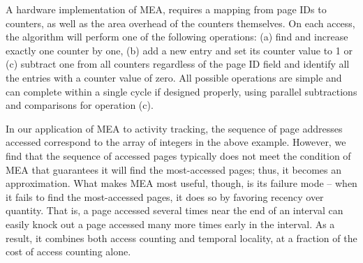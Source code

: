 A hardware implementation of MEA, requires a mapping from page IDs to counters, as well as the area overhead of the counters themselves. On each access, the algorithm will perform one of the following operations: (a) find and increase exactly one counter by one, (b) add a new entry and set its counter value to 1 or (c) subtract one from all counters regardless of the page ID field and identify all the entries with a counter value of zero. All possible operations are simple and can complete within a single cycle if designed properly, using parallel subtractions and comparisons for operation (c).



In our application of MEA to activity tracking, the sequence of page addresses accessed correspond to the array of integers in the above example. 
However, we find that the sequence of accessed pages typically does not
meet the condition of MEA that guarantees it will find the most-accessed
pages; thus, it becomes an approximation.  What makes MEA most useful,
though, is its failure mode -- when it fails to find the most-accessed pages,
it does so by favoring recency over quantity.  That is, a page accessed several
times near the end of an interval can easily knock out a page accessed many
more times early in the interval.  As a result, it combines both access
counting and temporal locality, at a fraction of the cost of access counting
alone.


